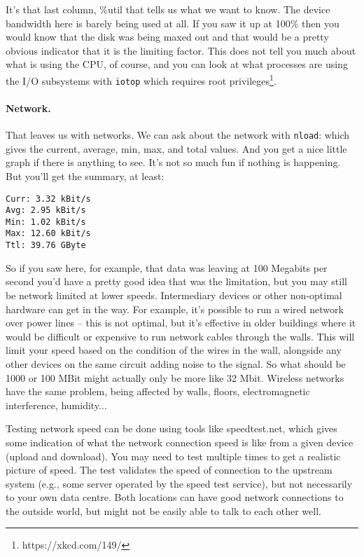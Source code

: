 It's that last column, \%util that tells us what we want to know. The device bandwidth here is barely being used at all. If you saw it up at 100\% then you would know that the disk was being maxed out and that would be a pretty obvious indicator that it is the limiting factor. This does not tell you much about what is using the CPU, of course, and you can look at what processes are using the I/O subsystems with \texttt{iotop} which requires root privileges\footnote{https://xkcd.com/149/}.

\paragraph{Network.} That leaves us with networks. We can ask about the network with \texttt{nload}: which gives the current, average, min, max, and total values. And you get a nice little graph if there is anything to see. It's not so much fun if nothing is happening. But you'll get the summary, at least:

\begin{verbatim}
Curr: 3.32 kBit/s
Avg: 2.95 kBit/s
Min: 1.02 kBit/s
Max: 12.60 kBit/s
Ttl: 39.76 GByte                                                                                       \end{verbatim}

So if you saw here, for example, that data was leaving at 100 Megabits per second you'd have a pretty good idea that was the limitation, but you may still be network limited at lower speeds. Intermediary devices or other non-optimal hardware can get in the way. For example, it's possible to run a wired network over power lines -- this is not optimal, but it's effective in older buildings where it would be difficult or expensive to run network cables through the walls. This will limit your speed based on the condition of the wires in the wall, alongside any other devices on the same circuit adding noise to the signal. So what should be 1000 or 100 MBit might actually only be more like 32 Mbit. Wireless networks have the same problem, being affected by walls, floors, electromagnetic interference, humidity...

Testing network speed can be done using tools like speedtest.net, which gives some indication of what the network connection speed is like from a given device (upload and download). You may need to test multiple times to get a realistic picture of speed. The test validates the speed of connection to the upstream system (e.g., some server operated by the speed test service), but not necessarily to your own data centre. Both locations can have good network connections to the outside world, but might not be easily able to talk to each other well.

